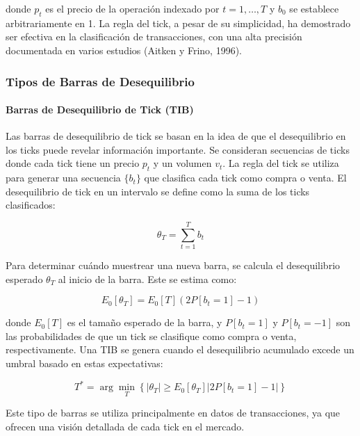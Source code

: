 \documentclass[a4paper,12pt, twoside]{report}
\begin{document}
donde \(p_t\) es el precio de la operación indexado por \(t = 1,\ldots,T\) y \(b_0\) se establece arbitrariamente en 1. 
La regla del tick, a pesar de su simplicidad, ha demostrado ser efectiva en la clasificación de transacciones, con una 
alta precisión documentada en varios estudios (Aitken y Frino, 1996).

\subsubsection{Tipos de Barras de Desequilibrio}

\paragraph{Barras de Desequilibrio de Tick (TIB)}

Las barras de desequilibrio de tick se basan en la idea de que el desequilibrio en los ticks puede revelar información 
importante. Se consideran secuencias de ticks donde cada tick tiene un precio \(p_t\) y un volumen \(v_t\). La regla del tick 
se utiliza para generar una secuencia \(\{b_t\}\) que clasifica cada tick como compra o venta. El desequilibrio de tick en un 
intervalo se define como la suma de los ticks clasificados:

\begin{equation}
\theta_T = \sum_{t=1}^{T} b_t
\end{equation}

Para determinar cuándo muestrear una nueva barra, se calcula el desequilibrio esperado \(\theta_T\) al inicio de la barra. 
Este se estima como:

\begin{equation}
E_0[\theta_T] = E_0[T](2P[b_t = 1] - 1)
\end{equation}

donde \(E_0[T]\) es el tamaño esperado de la barra, y \(P[b_t = 1]\) y \(P[b_t = -1]\) son las probabilidades de que un tick 
se clasifique como compra o venta, respectivamente. Una TIB se genera cuando el desequilibrio acumulado excede un umbral basado 
en estas expectativas:

\begin{equation}
T^* = \arg \min_T \left\{  | \theta_T | \geq E_0[\theta_T] |2P[b_t = 1] - 1 | \right\}
\end{equation}

Este tipo de barras se utiliza principalmente en datos de transacciones, ya que ofrecen una visión detallada de cada tick 
en el mercado.
\end{document}
